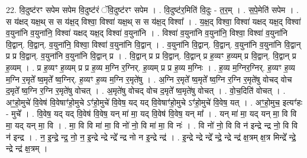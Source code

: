 \documentclass[17pt]{extarticle}
\begin{document}
22. वि॒दुष्ट॑रꣳ सपेम सपेम वि॒दुष्ट॑रं ॅवि॒दुष्ट॑रꣳ सपेम । . वि॒दुष्ट॑र॒मिति॑ वि॒दुः - त॒र॒म् । . स॒पे॒मेति॑ सपेम । . स य॑क्षद् यक्ष॒थ् स स य॑क्ष॒द् विश्वा॒ विश्वा॑ यक्ष॒थ् स स य॑क्ष॒द् विश्वा᳚ । . य॒क्ष॒द् विश्वा॒ विश्वा॑ यक्षद् यक्ष॒द् विश्वा॑ व॒युना॑नि व॒युना॑नि॒ विश्वा॑ यक्षद् यक्ष॒द् विश्वा॑ व॒युना॑नि । . विश्वा॑ व॒युना॑नि व॒युना॑नि॒ विश्वा॒ विश्वा॑ व॒युना॑नि वि॒द्वान्. वि॒द्वान्. व॒युना॑नि॒ विश्वा॒ विश्वा॑ व॒युना॑नि वि॒द्वान् । . व॒युना॑नि वि॒द्वान्. वि॒द्वान्. व॒युना॑नि व॒युना॑नि वि॒द्वान् प्र प्र वि॒द्वान्. व॒युना॑नि व॒युना॑नि वि॒द्वान् प्र । . वि॒द्वान् प्र प्र वि॒द्वान्. वि॒द्वान् प्र ह॒व्यꣳ ह॒व्यम् प्र वि॒द्वान्. वि॒द्वान् प्र ह॒व्यम् । . प्र ह॒व्यꣳ ह॒व्यम् प्र प्र ह॒व्य म॒ग्नि र॒ग्निर्. ह॒व्यम् प्र प्र ह॒व्य म॒ग्निः । . ह॒व्य म॒ग्निर॒ग्निर्. ह॒व्यꣳ ह॒व्य म॒ग्नि र॒मृते᳚ ष्व॒मृते᳚ ष्व॒ग्निर्. ह॒व्यꣳ ह॒व्य म॒ग्नि र॒मृते॑षु । . अ॒ग्नि र॒मृते᳚ ष्व॒मृते᳚ ष्व॒ग्नि र॒ग्नि र॒मृते॑षु वोचद् वोच द॒मृते᳚ ष्व॒ग्नि र॒ग्नि र॒मृते॑षु वोचत् । . अ॒मृते॑षु वोचद् वोच द॒मृते᳚ ष्व॒मृते॑षु वोचत् । . वो॒च॒दिति॑ वोचत् । . अꣳ॒॒हो॒मुचे॑ वि॒वेष॑ वि॒वेषाꣳ॑हो॒मुचे ऽꣳ॑हो॒मुचे॑ वि॒वेष॒ यद् यद् वि॒वेषाꣳ॑हो॒मुचे 
ऽꣳ॑हो॒मुचे॑ वि॒वेष॒ यत् । . अꣳ॒॒हो॒मुच॒ इत्यꣳ॑हः - मुचे᳚ । . वि॒वेष॒ यद् यद् वि॒वेष॑ वि॒वेष॒ यन् मा॑ मा॒ यद् वि॒वेष॑ वि॒वेष॒ यन् मा᳚ । . यन् मा॑ मा॒ यद् यन् मा॒ वि वि मा॒ यद् यन् मा॒ वि । . मा॒ वि वि मा॑ मा॒ वि नो॑ नो॒ वि मा॑ मा॒ वि नः॑ । . वि नो॑ नो॒ वि वि न॑ इन्द्रे न्द्र नो॒ वि वि न॑ इन्द्र । . न॒ इ॒न्द्रे॒ न्द्र॒ नो॒ न॒ इ॒न्द्रे न्द्रे न्द्रे᳚ न्द्र नो न इ॒न्द्रे न्द्र॑ । . इ॒न्द्रे न्द्रे न्द्रे᳚ न्द्रे॒ न्द्रे न्द्र॑ क्ष॒त्रम् क्ष॒त्र मिन्द्रे᳚ न्द्रे॒ न्द्रे न्द्र॑ क्ष॒त्रम् । \newline
\end{document}
